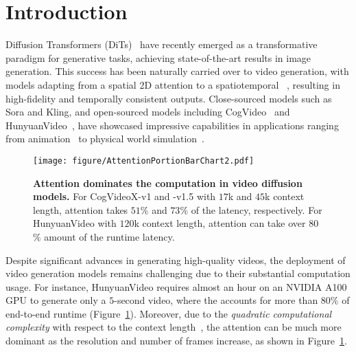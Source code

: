 \section{Introduction}\label{sec:introduction}


Diffusion Transformers (DiTs)~\citep{peebles2023scalable} have recently emerged as a transformative paradigm for generative tasks, achieving state-of-the-art results in image generation. This success has been naturally carried over to video generation, with models adapting from a spatial 2D attention to a spatiotemporal \attn{}~\cite{arnab2021vivit,yang2024cogvideox,kong2024hunyuanvideo}, resulting in high-fidelity and temporally consistent outputs.
Close-sourced models such as Sora and Kling, and open-sourced models including CogVideo~\citep{hongcogvideo} and HunyuanVideo~\citep{kong2024hunyuanvideo}, have showcased impressive capabilities in applications ranging from animation~\cite{guoanimatediff} to physical world simulation~\citep{liu2023world}. 

\begin{figure}[t]
    \centering
    \begin{minipage}[t]{\linewidth}
        \texttt{[image: figure/AttentionPortionBarChart2.pdf]}
        \caption{\textbf{Attention dominates the computation in video diffusion models.} For CogVideoX-v1 and -v1.5 with $17$k and $45$k context length, attention takes $51$\% and $73$\% of the latency, respectively. For HunyuanVideo with $120$k context length, attention can take over $80$\% amount of the runtime latency.}
        \label{fig:intro-op-breakdown}
    \end{minipage}
\end{figure}

Despite significant advances in generating high-quality videos, the deployment of video generation models remains challenging due to their substantial computation usage. For instance, HunyuanVideo requires almost an hour on an NVIDIA A100 GPU to generate only a $5$-second video, where the \attn{} accounts for more than $80$\% of end-to-end runtime (Figure~\ref{fig:intro-op-breakdown}). Moreover, due to the \textit{quadratic computational complexity} with respect to the context length~\cite{dao2022flashattentionfastmemoryefficientexact}, the attention can be much more dominant as the resolution and number of frames increase, as shown in Figure~\ref{fig:intro-op-breakdown}. 




